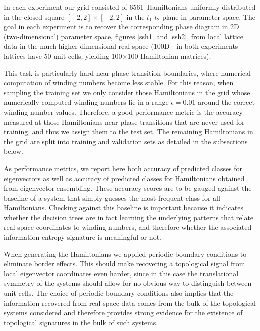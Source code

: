 \documentclass[10pt]{revtex4-1}
\newcommand\nHam{6561}  %
\newcommand\epsilonValue{0.01}  %
\begin{document}
In each experiment our grid consisted of \nHam\ Hamiltonians uniformly distributed in the closed square $[-2,2]\times[-2,2]$ in the $t_1$-$t_2$ plane in parameter space. The goal in each experiment is to recover the corresponding phase diagram in 2D (two-dimensional) parameter space, figures \ref{ssh1} and \ref{ssh2}, from local lattice data in the much higher-dimensional real space (100D - in both experiments lattices have 50 unit cells, yielding 100$\times$100 Hamiltonian matrices).

This task is particularly hard near phase transition boundaries, where numerical computation of winding numbers become less stable. For this reason, when sampling the training set we only consider those Hamiltonians in the grid whose numerically computed winding numbers lie in a range $\epsilon = \epsilonValue$ around the correct winding number values. Therefore, a good performance metric is the accuracy measured at those Hamiltonians near phase transitions that are never used for training, and thus we assign them to the test set. The remaining Hamiltonians in the grid are split into training and validation sets as detailed in the subsections below.

As performance metrics, we report here both accuracy of predicted classes for eigenvectors as well as accuracy of predicted classes for Hamiltonians obtained from eigenvector ensembling. These accuracy scores are to be gauged against the baseline of a system that simply guesses the most frequent class for all Hamiltonians. Checking against this baseline is important because it indicates whether the decision trees are in fact learning the underlying patterns that relate real space coordinates to winding numbers, and therefore whether the associated information entropy signature is meaningful or not.

When generating the Hamiltonians we applied periodic boundary conditions to eliminate border effects. This should make recovering a topological signal from local eigenvector coordinates even harder, since in this case the translational symmetry of the systems should allow for no obvious way to distinguish between unit cells. The choice of periodic boundary conditions also implies that the information recovered from real space data comes from the bulk of the topological systems considered and therefore provides strong evidence for the existence of topological signatures in the bulk of such systems. 
\end{document}
